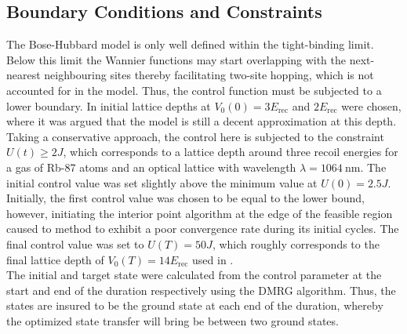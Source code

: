 \subsection{Boundary Conditions and Constraints}
The Bose-Hubbard model is only well defined within the tight-binding limit. Below this limit the Wannier functions may start overlapping with the next-nearest neighbouring sites thereby facilitating two-site hopping, which is not accounted for in the model. Thus, the control function must be subjected to a lower boundary. In \cite{FrankBloch,Doria2011} initial lattice depths at $V_0 (0) = 3 E_{\mathrm{rec}}$ and $2 E_{\mathrm{rec}}$ were chosen, where it was argued that the model is still a decent approximation at this depth.
Taking a conservative approach, the control here is subjected to the constraint $U (t) \geq 2 J$, which corresponds to a lattice depth around three recoil energies for a gas of Rb-87 atoms and an optical lattice with wavelength $\lambda = 1064 \: \mathrm{nm}$. 
The initial control value was set slightly above the minimum value at $U (0) = 2.5 J$. Initially, the first control value was chosen to be equal to the lower bound, however, initiating the interior point algorithm at the edge of the feasible region caused to method to exhibit a poor convergence rate during its initial cycles.
The final control value was set to $U (T) = 50 J$, which roughly corresponds to the final lattice depth of $V_0 (T) = 14 E_{\mathrm{rec}}$ used in \cite{FrankBloch}.\\
The initial and target state were calculated from the control parameter at the start and end of the duration respectively using the DMRG algorithm. Thus, the states are insured to be the ground state at each end of the duration, whereby the optimized state transfer will bring be between two ground states.


